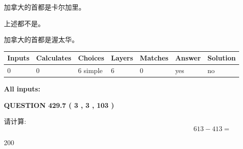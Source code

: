 \documentclass{ctexart}
\begin{document}
 
加拿大的首都是卡尔加里。
 
 
 上述都不是。
 
 
\noindent{}
 
 
加拿大的首都是渥太华。
 
 
\noindent{}
 
 
   
   
   
   
\noindent\begin{tabular}{|l|l|l|l|l|l|l|}
 \hline
Inputs & Calculates & Choices & Layers & Matches & Answer & Solution \\ \hline
 0  & 
 0  & 
 6
  simple  
  & 
 6  & 
 0  & 
  yes & 
  no 
  \\ \hline
 \end{tabular}
   
   
   
   
\noindent{}
   
   
   
   
\noindent\vspace{0.1in}\hspace{-0.08in} {\textbf{\Large{All inputs: }}}
   
   
  
\vspace{0.2in}
  
{\textbf{\Large{QUESTION
429.7 
 ( 3 , 3 , 103 )
}}}
  
  
 
请计算:
\begin{equation}
613 -   %
413 = \nonumber
\end{equation}
 
 
 
\noindent{}
 
 

200
 
 
\noindent{}
 
 

 
 
 
\noindent{}
 
\end{document}
